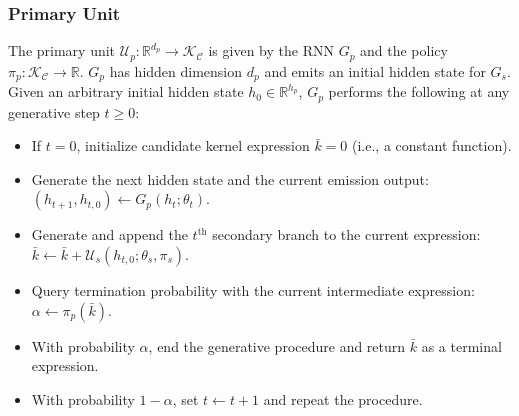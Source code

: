 \subsubsection{Primary Unit}
The primary unit $\mathcal{U}_p: \mathbb{R}^{d_p} \rightarrow \mathcal{K_C}$ is given by the RNN $G_p$ and the policy $\pi_p: \mathcal{K_C} \rightarrow \mathbb{R}$. $G_p$ has hidden dimension $d_p$ and emits an initial hidden state for $G_s$. Given an arbitrary initial hidden state $h_0 \in \mathbb{R}^{h_p}$, $G_p$ performs the following at any generative step $t \geq 0$:
\begin{itemize}
\item If $t=0$, initialize candidate kernel expression $\bar{k} = 0$ (i.e., a constant function).
\item Generate the next hidden state and the current emission output: $(h_{t+1}, h_{t,0}) \leftarrow G_p(h_t; \theta_t)$. 
\item Generate and append the $t^{\text{th}}$ secondary branch to the current expression: $\bar{k} \leftarrow \bar{k} + \mathcal{U}_s(h_{t,0}; \theta_s, \pi_s)$.
\item Query termination probability with the current intermediate expression: $\alpha \leftarrow \pi_p(\bar{k})$. 
\item With probability $\alpha$, end the generative procedure and return $\bar{k}$ as a terminal expression. 
\item With probability $1 - \alpha$, set $t \leftarrow t+1$ and repeat the procedure.
\end{itemize}

